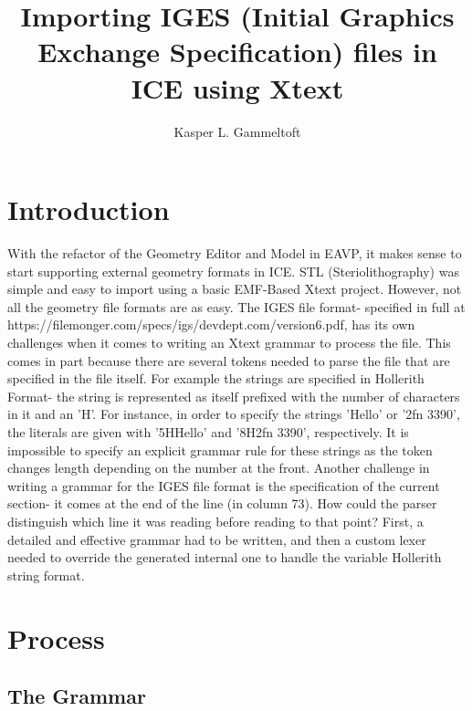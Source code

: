 \title{Importing IGES (Initial Graphics Exchange Specification) files in ICE using Xtext}

\author{Kasper L. Gammeltoft}

\maketitle

\chapter{Introduction}


With the refactor of the Geometry Editor and Model in EAVP, it makes sense to start supporting external geometry formats in ICE. STL (Steriolithography) was simple and easy to import using a basic EMF-Based Xtext project. However, not all the geometry file formats are as easy. The IGES file format- specified in full at https://filemonger.com/specs/igs/devdept.com/version6.pdf, has its own challenges when it comes to writing an Xtext grammar to process the file. This comes in part because there are several tokens needed to parse the file that are specified in the file itself. For example the strings are specified in Hollerith Format- the string is represented as itself prefixed with the number of characters in it and an 'H'. For instance, in order to specify the strings 'Hello' or '2fn 3390', the literals are given with '5HHello' and '8H2fn 3390', respectively. It is impossible to specify an explicit grammar rule for these strings as the token changes length depending on the number at the front. Another challenge in writing a grammar for the IGES file format is the specification of the current section- it comes at the end of the line (in column 73). How could the parser distinguish which line it was reading before reading to that point? First, a detailed and effective grammar had to be written, and then a custom lexer needed to override the generated internal one to handle the variable Hollerith string format.


\chapter{Process}

\section{The Grammar}


